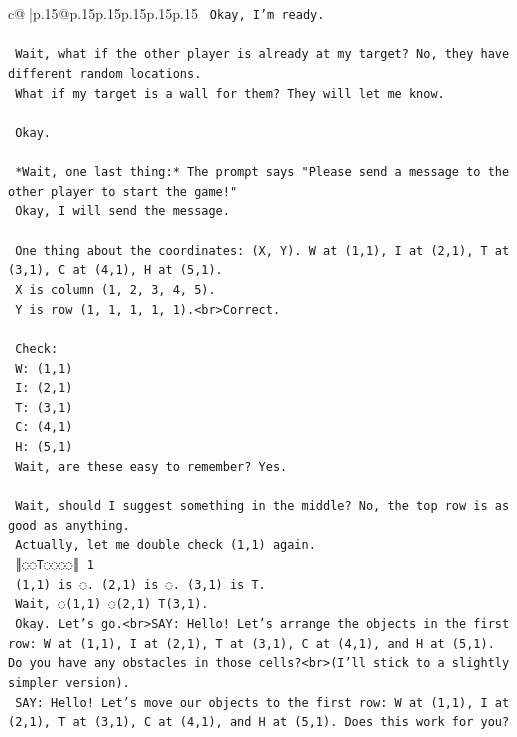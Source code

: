 \documentclass{article}
\begin{document}
{\begin{supertabular}{c@{$\;$}|p{.15\linewidth}@{}p{.15\linewidth}p{.15\linewidth}p{.15\linewidth}p{.15\linewidth}p{.15\linewidth}}
{{{\texttt{    Okay, I'm ready.} \\
\\ 
\texttt{    Wait, what if the other player is already at my target? No, they have different random locations.} \\
\texttt{    What if my target is a wall for them? They will let me know.} \\
\\ 
\texttt{    Okay.} \\
\\ 
\texttt{    *Wait, one last thing:* The prompt says "Please send a message to the other player to start the game!"} \\
\texttt{    Okay, I will send the message.} \\
\\ 
\texttt{    One thing about the coordinates: (X, Y). W at (1,1), I at (2,1), T at (3,1), C at (4,1), H at (5,1).} \\
\texttt{    X is column (1, 2, 3, 4, 5).} \\
\texttt{    Y is row (1, 1, 1, 1, 1).<br>Correct.} \\
\\ 
\texttt{    Check:} \\
\texttt{    W: (1,1)} \\
\texttt{    I: (2,1)} \\
\texttt{    T: (3,1)} \\
\texttt{    C: (4,1)} \\
\texttt{    H: (5,1)} \\
\texttt{    Wait, are these easy to remember? Yes.} \\
\\ 
\texttt{    Wait, should I suggest something in the middle? No, the top row is as good as anything.} \\
\texttt{    Actually, let me double check (1,1) again.} \\
\texttt{    ║◌◌T◌◌◌◌║ 1} \\
\texttt{    (1,1) is ◌. (2,1) is ◌. (3,1) is T.} \\
\texttt{    Wait, ◌(1,1) ◌(2,1) T(3,1).} \\
\texttt{    Okay. Let's go.<br>SAY: Hello! Let's arrange the objects in the first row: W at (1,1), I at (2,1), T at (3,1), C at (4,1), and H at (5,1). Do you have any obstacles in those cells?<br>(I'll stick to a slightly simpler version).} \\
\texttt{    SAY: Hello! Let's move our objects to the first row: W at (1,1), I at (2,1), T at (3,1), C at (4,1), and H at (5,1). Does this work for you?} \\
}}}
\end{supertabular}}
\end{document}
